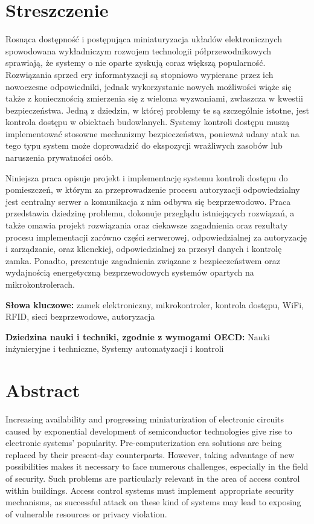 \section*{Streszczenie}

	Rosnąca dostępność i postępująca miniaturyzacja układów elektronicznych spowodowana wykładniczym rozwojem technologii półprzewodnikowych sprawiają, że systemy o nie oparte zyskują coraz większą popularność. Rozwiązania sprzed ery informatyzacji są stopniowo wypierane przez ich nowoczesne odpowiedniki, jednak wykorzystanie nowych możliwości wiąże się także z koniecznością zmierzenia się z wieloma wyzwaniami, zwłaszcza w kwestii bezpieczeństwa. Jedną z dziedzin, w której problemy te są szczególnie istotne, jest kontrola dostępu w obiektach budowlanych. Systemy kontroli dostępu muszą implementować stosowne mechanizmy bezpieczeństwa, ponieważ udany atak na tego typu system może doprowadzić do ekspozycji wrażliwych zasobów lub naruszenia prywatności osób.

	Niniejsza praca opisuje projekt i implementację systemu kontroli dostępu do pomieszczeń, w którym za przeprowadzenie procesu autoryzacji odpowiedzialny jest centralny serwer a komunikacja z nim odbywa się bezprzewodowo. Praca przedstawia dziedzinę problemu, dokonuje przeglądu istniejących rozwiązań, a także omawia projekt rozwiązania oraz ciekawsze zagadnienia oraz rezultaty procesu implementacji zarówno części serwerowej, odpowiedzialnej za autoryzację i zarządzanie, oraz klienckiej, odpowiedzialnej za przesył danych i kontrolę zamka. Ponadto, prezentuje zagadnienia związane z bezpieczeństwem oraz wydajnością energetyczną bezprzewodowych systemów opartych na mikrokontrolerach.

	\textbf{Słowa kluczowe:} zamek elektroniczny, mikrokontroler, kontrola dostępu, WiFi, RFID, sieci bezprzewodowe, autoryzacja

	\textbf{Dziedzina nauki i techniki, zgodnie z wymogami OECD:} Nauki inżynieryjne i techniczne, Systemy automatyzacji i kontroli

\section*{Abstract}

	Increasing availability and progressing miniaturization of electronic circuits caused by exponential development of semiconductor technologies give rise to electronic systems' popularity. Pre-computerization era solutions are being replaced by their present-day counterparts. However, taking advantage of new possibilities makes it necessary to face numerous challenges, especially in the field of security. Such problems are particularly relevant in the area of access control within buildings. Access control systems must implement appropriate security mechanisms, as successful attack on these kind of systems may lead to exposing of vulnerable resources or privacy violation.

